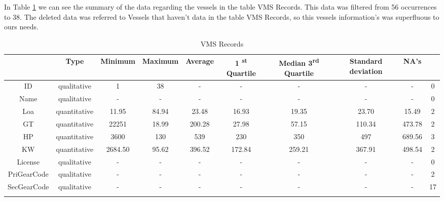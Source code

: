 In Table \ref{table:vms_vessels} we can see the summary of the data regarding the vessels in the table VMS Records. This data was filtered from 56 occurrences to 38. The deleted data was referred to Vessels that haven’t data in the table VMS Records, so this vessels information’s was superfluous to ours needs. 


\begin {table}[H]
\begin{center}
\begin{tabular}{c|c|c|c|c|c|c|c|c|c}
            & Type & Minimum & Maximum & Average & 1 \textsuperscript{st} Quartile & Median  3\textsuperscript{rd} Quartile & Standard deviation & NA's\\
\hline
ID     & qualitative &1&38&-&-&-&-&-&0\\
Name         & qualitative &-&-&-&-&-&-&-&0\\
Loa         & quantitative &11.95&84.94&23.48&16.93&19.35&23.70&15.49&2\\
GT        &quantitative&22251&18.99&200.28&27.98&57.15&110.34&473.78&2\\
HP        & quantitative&3600&130&539&230&350&497&689.56&3\\
KW        &quantitative&2684.50&95.62&396.52&172.84&259.21&367.91&498.54&2\\
License        &qualitative&-&-&-&-&-&-&-&0\\
PriGearCode       &qualitative&-&-&-&-&-&-&-&2\\
SecGearCode        &qualitative &-&-&-&-&-&-&-&17\\


           
\label{table:vms_vessels}
\end{tabular}
\caption {VMS Records}
\end{center}
\end {table}
